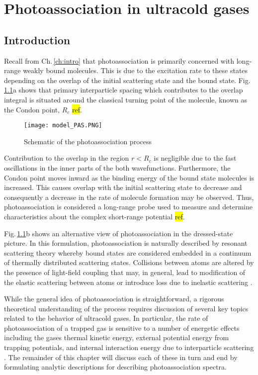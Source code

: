 \chapter{Photoassociation in ultracold gases} \label{ch:chap3}
\section{Introduction} \label{sec:pas_intro}
Recall from Ch.\,\ref{ch:intro} that photoassociation is primarily concerned with long-range weakly bound molecules.
This is due to the excitation rate to these states depending on the overlap of the initial scattering state and the bound state.
Fig.\,\ref{fig:3pasSch}a shows that primary interparticle spacing which contributes to the overlap integral is situated around the classical turning point of the molecule, known as the Condon point, $R_c$ \hl{ref}.
\begin{figure}
	\centerline{
	\texttt{[image: model\_PAS.PNG]}}
	\caption{Schematic of the photoassociation process}{}
	\label{fig:3pasSch}
\end{figure}
Contribution to the overlap in the region $r < R_c$ is negligible due to the fast oscillations in the inner parts of the both wavefunctions.
Furthermore, the Condon point moves inward as the binding energy of the bound state molecules is increased. 
This causes overlap with the initial scattering state to decrease and consequently a decrease in the rate of molecule formation may be observed.
Thus, photoassociation is considered a long-range probe used to measure and determine characteristics about the complex short-range potential \hl{ref}.

Fig.\,\ref{fig:3pasSch}b shows an alternative view of photoassociation in the dressed-state picture.
In this formulation, photoassociation is naturally described by resonant scattering theory whereby bound states are considered embedded in a continuum of thermally distributed scattering states.
Collisions between atoms are altered by the presence of light-field coupling that may, in general, lead to modification of the elastic scattering between atoms or introduce loss due to inelastic scattering  \cite{Jones2006, Thorsheim1987, Fano1961, Nicholson2015a}.

While the general idea of photoassociation is straightforward, a rigorous theoretical understanding of the process requires discussion of several key topics related to the behavior of ultracold gases.
In particular, the rate of photoassociation of a trapped gas is sensitive to a number of energetic effects including the gases thermal kinetic energy, external potential energy from trapping potentials, and internal interaction energy due to interparticle scattering \cite{Julienne2009a}.
The remainder of this chapter will discuss each of these in turn and end by formulating analytic descriptions for describing photoassociation spectra.	

